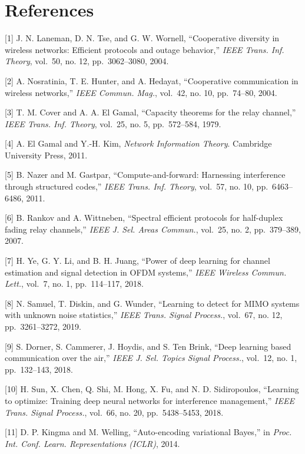 \chapter{References}\label{sec:references}

{[}1{]} J. N. Laneman, D. N. Tse, and G. W. Wornell, ``Cooperative diversity in wireless networks: Efficient protocols and outage behavior,'' \emph{IEEE Trans. Inf. Theory}, vol.~50, no. 12, pp.~3062--3080, 2004.

{[}2{]} A. Nosratinia, T. E. Hunter, and A. Hedayat, ``Cooperative communication in wireless networks,'' \emph{IEEE Commun. Mag.}, vol.~42, no. 10, pp.~74--80, 2004.

{[}3{]} T. M. Cover and A. A. El Gamal, ``Capacity theorems for the relay channel,'' \emph{IEEE Trans. Inf. Theory}, vol.~25, no. 5, pp.~572--584, 1979.

{[}4{]} A. El Gamal and Y.-H. Kim, \emph{Network Information Theory}. Cambridge University Press, 2011.

{[}5{]} B. Nazer and M. Gastpar, ``Compute-and-forward: Harnessing interference through structured codes,'' \emph{IEEE Trans. Inf. Theory}, vol.~57, no. 10, pp.~6463--6486, 2011.

{[}6{]} B. Rankov and A. Wittneben, ``Spectral efficient protocols for half-duplex fading relay channels,'' \emph{IEEE J. Sel. Areas Commun.}, vol.~25, no. 2, pp.~379--389, 2007.

{[}7{]} H. Ye, G. Y. Li, and B. H. Juang, ``Power of deep learning for channel estimation and signal detection in OFDM systems,'' \emph{IEEE Wireless Commun. Lett.}, vol.~7, no. 1, pp.~114--117, 2018.

{[}8{]} N. Samuel, T. Diskin, and G. Wunder, ``Learning to detect for MIMO systems with unknown noise statistics,'' \emph{IEEE Trans. Signal Process.}, vol.~67, no. 12, pp.~3261--3272, 2019.

{[}9{]} S. Dorner, S. Cammerer, J. Hoydis, and S. Ten Brink, ``Deep learning based communication over the air,'' \emph{IEEE J. Sel. Topics Signal Process.}, vol.~12, no. 1, pp.~132--143, 2018.

{[}10{]} H. Sun, X. Chen, Q. Shi, M. Hong, X. Fu, and N. D. Sidiropoulos, ``Learning to optimize: Training deep neural networks for interference management,'' \emph{IEEE Trans. Signal Process.}, vol.~66, no. 20, pp.~5438--5453, 2018.

{[}11{]} D. P. Kingma and M. Welling, ``Auto-encoding variational Bayes,'' in \emph{Proc. Int. Conf. Learn. Representations (ICLR)}, 2014.

